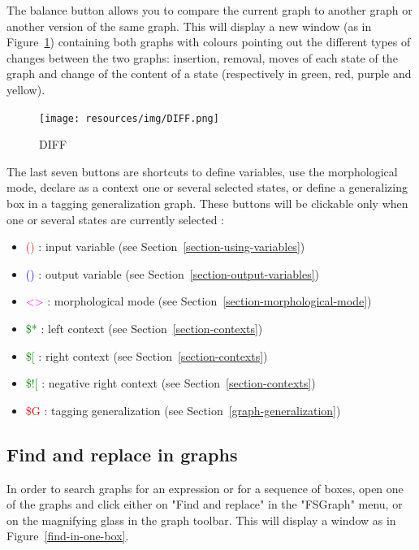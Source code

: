 \bigskip
\noindent The balance button allows you to compare the current graph to another graph or another version of the same graph. This will display a new window (as in Figure~\ref{Graph-DIFF}) containing both graphs with colours pointing out the different types of changes between the two graphs: insertion, removal, moves of each state of the graph and change of the content of a state (respectively in green, red, purple and yellow).

\bigskip
\noindent 
\begin{figure}[!ht]
\begin{center}
\texttt{[image: resources/img/DIFF.png]}
\caption{DIFF\label{Graph-DIFF}}
\end{center}
\end{figure}
\bigskip
\noindent 

The last seven buttons are shortcuts to define variables, use the morphological mode, declare as a context one or several selected states, or define a generalizing box in a tagging generalization graph. These buttons will be clickable only when one or several states are currently selected :
\begin{itemize}
\item \textcolor{red}{()}  : input variable	(see Section~\ref{section-using-variables})
\item \textcolor{blue}{()} : output variable (see Section~\ref{section-output-variables})
\item \textcolor{magenta}{<>}  : morphological mode (see Section~\ref{section-morphological-mode})
\item \textcolor{green}{\$*} : left context (see Section~\ref{section-contexts})
\item \textcolor{green}{\$[} : right context (see Section~\ref{section-contexts})
\item \textcolor{green}{\$![} : negative right context (see Section~\ref{section-contexts})
\item \textcolor{red}{\$G}  : tagging generalization (see Section~\ref{graph-generalization})
\end{itemize}

\subsection{Find and replace in graphs}
\label{find-replace}
In order to search graphs for an expression or for a sequence of boxes, open one of
the graphs and click either on "Find and replace" in the "FSGraph" menu, or on the
magnifying glass in the graph toolbar. This will display a window as in
Figure~\ref{find-in-one-box}.


